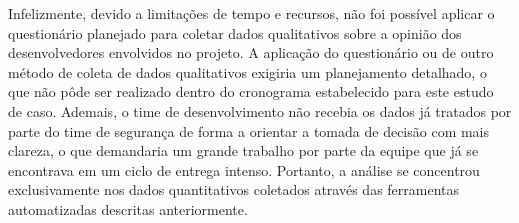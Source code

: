 Infelizmente, devido a limitações de tempo e recursos, não foi possível aplicar o questionário planejado para coletar dados qualitativos sobre a opinião dos desenvolvedores envolvidos no projeto. A aplicação do questionário ou de outro método de coleta de dados qualitativos exigiria um planejamento detalhado, o que não pôde ser realizado dentro do cronograma estabelecido para este estudo de caso. Ademais, o time de desenvolvimento não recebia os dados já tratados por parte do time de segurança de forma a orientar a tomada de decisão com mais clareza, o que demandaria um grande trabalho por parte da equipe que já se encontrava em um ciclo de entrega intenso. Portanto, a análise se concentrou exclusivamente nos dados quantitativos coletados através das ferramentas automatizadas descritas anteriormente.